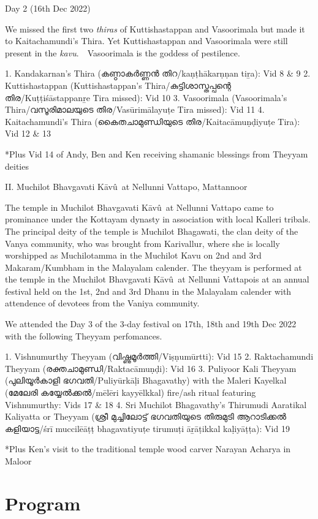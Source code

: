 \documentclass[a4paper, 11pt]{article} %
\newcommand{\Kavu}[0]{K\={a}v\^{u}}
\begin{document}
Day 2 (16th Dec 2022)

We missed the first two \textit{thiras} of Kuttishastappan and Vasoorimala but made it to Kaitachamundi's Thira. Yet Kuttishastappan and Vasoorimala were still present in the \textit{kavu}.　Vasoorimala is the goddess of pestilence.

1. Kandakarnan's Thira (കണ്ഠാകർണ്ണൻ തിറ/kaṇṭhākarṇṇan tiṟa): Vid 8 & 9
2. Kuttishastappan (Kuttishastappan's Thira/കുട്ടിശാസ്തപ്പന്റെ തിര/Kuṭṭiśāstappanṟe Tira missed): Vid 10
3. Vasoorimala (Vasoorimala's Thira/വസൂരിമാലയുടെ തിര/Vasūrimālayuṭe Tira missed): Vid 11
4. Kaitachamundi's Thira (കൈതചാമുണ്ഡിയുടെ തിര/Kaitacāmuṇḍiyuṭe Tira): Vid 12 & 13

*Plus Vid 14 of Andy, Ben and Ken receiving shamanic blessings from Theyyam deities 

II. Muchilot Bhavgavati \Kavu\ at Nellunni Vattapo, Mattannoor

The temple in Muchilot Bhavgavati \Kavu\ at Nellunni Vattapo came to prominance under the Kottayam dynasty in association with local Kalleri tribals. The principal deity of the temple is Muchilot Bhagawati, the clan deity of the Vanya community, who was brought from Karivallur, where she is locally worshipped as Muchilotamma in the Muchilot Kavu on 2nd and 3rd Makaram/Kumbham in the Malayalam calender. The theyyam is performed at the temple in the Muchilot Bhavgavati \Kavu\ at Nellunni Vattapois at an annual festival held on the 1st, 2nd and 3rd Dhanu in the Malayalam calender with attendence of devotees from the Vaniya community.

We attended the Day 3 of the 3-day festival on 17th, 18th and 19th Dec 2022 with the following Theyyam perfomances.

1. Vishnumurthy Theyyam (വിഷ്ണുമൂർത്തി/Viṣṇumūrtti): Vid 15
2. Raktachamundi Theyyam (രക്തചാമുണ്ഡി/Raktacāmuṇḍi): Vid 16
3. Puliyoor Kali Theyyam (പുലിയൂർകാളി ഭഗവതി/Puliyūrkāḷi Bhagavathy) with the Maleri Kayelkal (മേലേരി കയ്യേൽക്കൽ/mēlēri kayyēlkkal) fire/ash ritual featuring Vishnumurthy: Vids 17 & 18
4. Sri Muchilot Bhagavathy's Thirumudi Aaratikal Kaliyatta or Theyyam (ശ്രീ മുച്ചിലോട്ട് ഭഗവതിയുടെ തിരുമുടി ആറാടിക്കൽ കളിയാട്ട/śrī muccilēāṭṭ bhagavatiyuṭe tirumuṭi āṟāṭikkal kaḷiyāṭṭa): Vid 19

*Plus Ken's visit to the traditional temple wood carver Narayan Acharya in Maloor

\section{Program}%
  \label{sec:Program}
  
\end{document}
